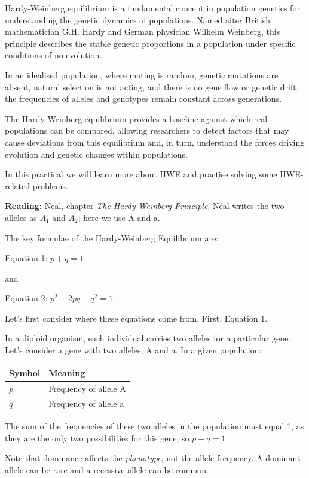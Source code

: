 \documentclass[
  a4paper]{book}
\newcounter{none} %
\begin{document}
Hardy-Weinberg equilibrium is a fundamental concept in population genetics for understanding the genetic dynamics of populations. Named after British mathematician G.H. Hardy and German physician Wilhelm Weinberg, this principle describes the stable genetic proportions in a population under specific conditions of no evolution.

In an idealised population, where mating is random, genetic mutations are absent, natural selection is not acting, and there is no gene flow or genetic drift, the frequencies of alleles and genotypes remain constant across generations.

The Hardy-Weinberg equilibrium provides a baseline against which real populations can be compared, allowing researchers to detect factors that may cause deviations from this equilibrium and, in turn, understand the forces driving evolution and genetic changes within populations.

In this practical we will learn more about HWE and practise solving some HWE-related problems.

\textbf{Reading:} Neal, chapter \emph{The Hardy-Weinberg Principle}. Neal writes the two alleles as \(A_1\) and \(A_2\); here we use A and a.

The key formulae of the Hardy-Weinberg Equilibrium are:

Equation 1: \(p + q = 1\)

and

Equation 2: \(p^2 + 2pq + q^2 = 1\).

Let's first consider where these equations come from. First, Equation 1.

In a diploid organism, each individual carries two alleles for a particular gene. Let's consider a gene with two alleles, A and a. In a given population:

{\def\LTcaptype{none} %
\begin{longtable}[]{@{}ll@{}}
\toprule\noalign{}
Symbol & Meaning \\
\midrule\noalign{}
\endhead
\bottomrule\noalign{}
\endlastfoot
\(p\) & Frequency of allele A \\
\(q\) & Frequency of allele a \\
\end{longtable}
}

The sum of the frequencies of these two alleles in the population must equal 1, as they are the only two possibilities for this gene, so \(p+q=1\).

Note that dominance affects the \emph{phenotype}, not the allele frequency. A dominant allele can be rare and a recessive allele can be common.
\end{document}
